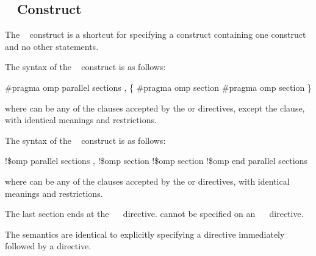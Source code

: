 {{{{\subsection{~ Construct}
\label{subsec:parallel sections Construct}
\summary
The ~ construct is a shortcut for specifying a  
construct containing one  construct and no other statements.

\syntax
\ccppspecificstart
The syntax of the ~ construct is as follows:

\begin{boxedcode}
\#pragma omp parallel sections \plc{[clause[ [},\plc{] clause] ... ] new-line}
    \{
    \plc{[}\#pragma omp section \plc{new-line]}
    \plc{[}\#pragma omp section 
        \plc{structured-block]}
    \}
\end{boxedcode}

where  can be any of the clauses accepted by the  or  
directives, except the  clause, with identical meanings and restrictions.
\ccppspecificend

\fortranspecificstart
The syntax of the ~ construct is as follows:

\begin{boxedcode}
!\$omp parallel sections \plc{[clause[ [},\plc{] clause] ... ]}
    \plc{[}!\$omp section\plc{]}
    \plc{[}!\$omp section 
        \plc{structured-block]}
!\$omp end parallel sections
\end{boxedcode}

where  can be any of the clauses accepted by the  or  
directives, with identical meanings and restrictions. 

The last section ends at the ~~ directive.  cannot be 
specified on an ~~ directive.
\fortranspecificend

\descr
\ccppspecificstart
The semantics are identical to explicitly specifying a  directive immediately 
followed by a  directive.
\ccppspecificend

}}}}
